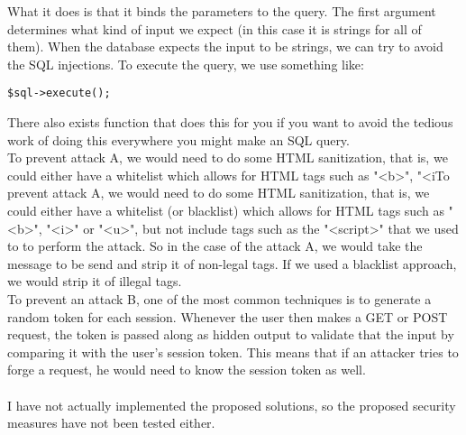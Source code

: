 \documentclass[a4paper]{article}
\begin{document}
What it does is that it binds the parameters to the query. The first argument determines what kind of input we expect (in this case it is strings for all of them). When the database expects the input to be strings, we can try to avoid the SQL injections. To execute the query, we use something like: \\
\begin{lstlisting}
$sql->execute();
\end{lstlisting}
There also exists function that does this for you if you want to avoid the tedious work of doing this everywhere you might make an SQL query. \\
To prevent attack A, we would need to do some HTML sanitization, that is, we could either have a whitelist which allows for HTML tags such as "<b>", "<iTo prevent attack A, we would need to do some HTML sanitization, that is, we could either have a whitelist (or blacklist) which allows for HTML tags such as "<b>", "<i>" or "<u>", but not include tags such as the "<script>" that we used to to perform the attack. So in the case of the attack A, we would take the message to be send and strip it of non-legal tags. If we used a blacklist approach, we would strip it of illegal tags. \\
To prevent an attack B, one of the most common techniques is to generate a random token for each session. Whenever the user then makes a GET or POST request, the token is passed along as hidden output to validate that the input by comparing it with the user's session token. This means that if an attacker tries to forge a request, he would need to know the session token as well. \\
\\
I have not actually implemented the proposed solutions, so the proposed security measures have not been tested either.
\end{document}

